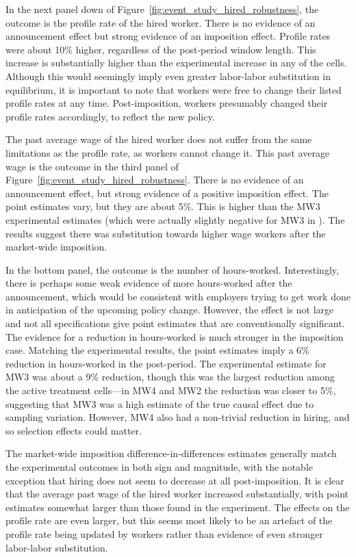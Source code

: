 In the next panel down of Figure~\ref{fig:event_study_hired_robustness}, the outcome is the profile rate of the hired worker. 
There is no evidence of an announcement effect but strong evidence of an imposition effect.   
Profile rates were about 10\% higher, regardless of the post-period window length.
This increase is substantially higher than the experimental increase in any of the cells. 
Although this would seemingly imply even greater labor-labor substitution in equilibrium, it is important to note that workers were free to change their listed profile rates at any time. 
Post-imposition, workers presumably changed their profile rates accordingly, to reflect the new policy.

The past average wage of the hired worker does not suffer from the same limitations as the profile rate, as workers cannot change it. 
This past average wage is the outcome in the third panel of Figure~\ref{fig:event_study_hired_robustness}. 
There is no evidence of an announcement effect, but strong evidence of a positive imposition effect.  
The point estimates vary, but they are about 5\%. 
This is higher than the MW3 experimental estimates (which were actually slightly negative for MW3 in \all{}). 
The results suggest there was substitution towards higher wage workers after the market-wide imposition.

In the bottom panel, the outcome is the number of hours-worked. 
Interestingly, there is perhaps some weak evidence of more hours-worked after the announcement, which would be consistent with employers trying to get work done in anticipation of the upcoming policy change. 
However, the effect is not large and not all specifications give point estimates that are conventionally significant.
The evidence for a reduction in hours-worked is much stronger in the imposition case. 
Matching the experimental results, the point estimates imply a 6\% reduction in hours-worked in the post-period. 
The experimental estimate for MW3 was about a 9\% reduction, though this was the largest reduction among the active treatment cells---in MW4 and MW2 the reduction was closer to 5\%, suggesting that MW3 was a high estimate of the true causal effect due to sampling variation. 
However, MW4 also had a non-trivial reduction in hiring, and so selection effects could matter.

The market-wide imposition difference-in-differences estimates generally match the experimental outcomes in both sign and magnitude, with the notable exception that hiring does not seem to decrease at all post-imposition. 
It is clear that the average past wage of the hired worker increased substantially, with point estimates somewhat larger than those found in the experiment. 
The effects on the profile rate are even larger, but this seems most likely to be an artefact of the profile rate being updated by workers rather than evidence of even stronger labor-labor substitution.



